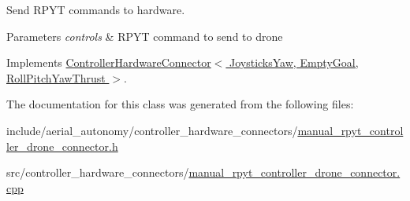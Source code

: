 Send R\-P\-Y\-T commands to hardware. 


\begin{DoxyParams}{Parameters}
{\em controls} & R\-P\-Y\-T command to send to drone \\
\hline
\end{DoxyParams}


Implements \hyperlink{classControllerHardwareConnector_a5fc86156d5c747aba36497732962d6d0}{Controller\-Hardware\-Connector$<$ Joysticks\-Yaw, Empty\-Goal, Roll\-Pitch\-Yaw\-Thrust $>$}.



The documentation for this class was generated from the following files\-:\begin{DoxyCompactItemize}
\item 
include/aerial\-\_\-autonomy/controller\-\_\-hardware\-\_\-connectors/\hyperlink{manual__rpyt__controller__drone__connector_8h}{manual\-\_\-rpyt\-\_\-controller\-\_\-drone\-\_\-connector.\-h}\item 
src/controller\-\_\-hardware\-\_\-connectors/\hyperlink{manual__rpyt__controller__drone__connector_8cpp}{manual\-\_\-rpyt\-\_\-controller\-\_\-drone\-\_\-connector.\-cpp}\end{DoxyCompactItemize}
